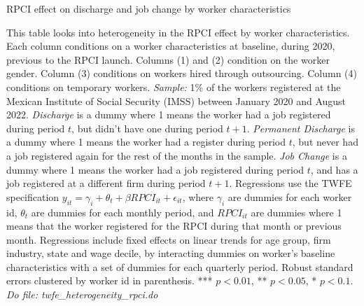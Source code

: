 \documentclass[oneside,11pt]{article}
\begin{document}
\begin{table}[H]
    \caption{RPCI effect on discharge and job change by worker characteristics}
    \label{twfe_job_hetero_wrk_char}
    \begin{center}
    \scriptsize{}
    \end{center}
\end{table}
\scriptsize{
\noindent This table looks into heterogeneity in the RPCI effect by worker characteristics. Each column conditions on a worker characteristics at baseline, during 2020, previous to the RPCI launch. Columns (1) and (2) condition on the worker gender. Column (3) conditions on workers hired through outsourcing. Column (4) conditions on temporary workers. \textit{Sample:} 1\% of the workers registered at the Mexican Institute of Social Security (IMSS) between January 2020 and August 2022. \textit{Discharge} is a dummy where 1 means the worker had a job registered during period $t$, but didn't have one during period $t+1$. \textit{Permanent Discharge} is a dummy where 1 means the worker had a register during period $t$, but never had a job registered again for the rest of the months in the sample. \textit{Job Change} is a dummy where 1 means the worker had a job registered during period $t$, and has a job registered at a different firm during period $t+1$. Regressions use the TWFE specification $y_{it} = \gamma_{i} + \theta_{t}+ \beta RPCI_{it} +\epsilon_{it}$, where $\gamma_{i}$ are dummies for each worker id, $\theta_{t}$ are dummies for each monthly period, and $RPCI_{it}$ are dummies where 1 means that the worker registered for the RPCI during that month or previous month. Regressions include fixed effects on linear trends for age group, firm industry, state and wage decile, by interacting dummies on worker's baseline characteristics with a set of dummies for each quarterly period. Robust standard errors clustered by worker id in parenthesis. *** $p<0.01$, ** $p<0.05$, * $p<0.1$.
\textit{Do file: twfe\_heterogeneity\_rpci.do}
}

\clearpage
\end{document}

